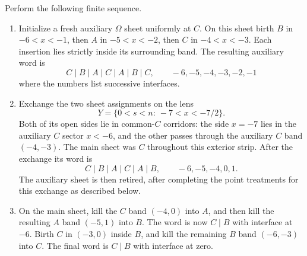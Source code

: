 \documentclass[11pt]{article}
\numberwithin{equation}{section}
\theoremstyle{definition}
\theoremstyle{remark}
\begin{document}
Perform the following finite sequence.
\begin{enumerate}
\item
Initialize a fresh auxiliary $\Omega$ sheet uniformly at $C$.  On this
sheet birth $B$ in $-6<x<-1$, then $A$ in $-5<x<-2$, then $C$ in
$-4<x<-3$.  Each insertion lies strictly inside its surrounding band.
The resulting auxiliary word is
\begin{equation}
 C\mid B\mid A\mid C\mid A\mid B\mid C,
 \qquad -6,-5,-4,-3,-2,-1
 \label{eq:geometry-aux-word}
\end{equation}
where the numbers list successive interfaces.
\item
Exchange the two sheet assignments on the lens
\begin{equation}
 Y=\{0<s<n:\ -7<x<-7/2\}.
 \label{eq:geometry-lens}
\end{equation}
Both of its open sides lie in common-$C$ corridors: the side $x=-7$
lies in the auxiliary $C$ sector $x<-6$, and the other passes
through the auxiliary $C$ band $(-4,-3)$.  The main sheet was $C$
throughout this exterior strip.  After the exchange its word is
\begin{equation}
 C\mid B\mid A\mid C\mid A\mid B,
 \qquad -6,-5,-4,0,1.
 \label{eq:geometry-main-word}
\end{equation}
The auxiliary sheet is then retired, after completing the point
treatments for this exchange as described below.
\item
On the main sheet, kill the $C$ band $(-4,0)$ into $A$, and then kill
the resulting $A$ band $(-5,1)$ into $B$.  The word is now $C\mid B$
with interface at $-6$.  Birth $C$ in $(-3,0)$ inside $B$, and kill
the remaining $B$ band $(-6,-3)$ into $C$.  The final word is
$C\mid B$ with interface at zero.
\end{enumerate}
\end{document}
